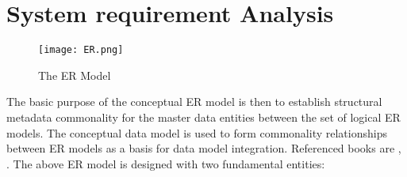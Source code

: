 \documentclass[12pt]{report}
\begin{document}
\newpage

\section{System requirement Analysis}
\begin{figure}[!htb]
\texttt{[image: ER.png]}
\centering
\caption{The ER Model}

\end{figure}

The basic purpose of the conceptual ER model is then to establish structural metadata commonality for the master data entities between the set of logical ER models. The conceptual data model is used to form commonality relationships between ER models as a basis for data model integration.  Referenced books are \cite{DUMMY:3}, \cite{DUMMY:4}. The above ER model is designed with two fundamental entities:
\end{document}

